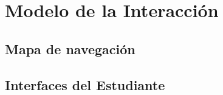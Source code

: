 \chapter{Modelo de la Interacción}


\section{Mapa de navegación}


\section{Interfaces del Estudiante}

